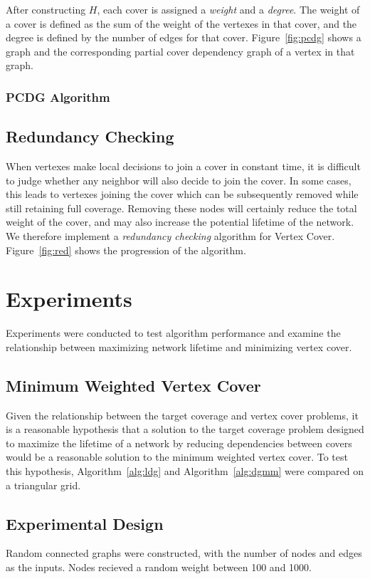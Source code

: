 After constructing $H$, each cover is assigned a {\em weight} and a {\em degree}. The weight of a cover is defined as the sum of the weight of the vertexes in that cover, and the degree is defined by the number of edges for that cover. Figure~\ref{fig:pcdg} shows a graph and the corresponding partial cover dependency graph of a vertex in that graph.



\subsubsection{PCDG Algorithm}

\subsection{Redundancy Checking}

When vertexes make local decisions to join a cover in constant time, it is difficult to judge whether any neighbor will also decide to join the cover. In some cases, this leads to vertexes joining the cover which can be subsequently removed while still retaining full coverage. Removing these nodes will certainly reduce the total weight of the cover, and may also increase the potential lifetime of the network. We therefore implement a {\em redundancy checking} algorithm for Vertex Cover. Figure~\ref{fig:red} shows the progression of the algorithm.

 

\section{Experiments}
\label{sec:experiment}
Experiments were conducted to test algorithm performance and examine the relationship between maximizing network lifetime and minimizing vertex cover.
\subsection{Minimum Weighted Vertex Cover}
\label{sub:mwvc-exp}
Given the relationship between the target coverage and vertex cover problems, it is a reasonable hypothesis that a solution to the target coverage problem designed to maximize the lifetime of a network by reducing dependencies between covers would be a reasonable solution to the minimum weighted vertex cover. To test this hypothesis, Algorithm~\ref{alg:ldg} and Algorithm~\ref{alg:dgmm} were compared on a triangular grid.
\subsection{Experimental Design}
\label{sub:exp-design}
Random connected graphs were constructed, with the number of nodes and edges as the inputs. Nodes recieved a random weight between 100 and 1000.    

